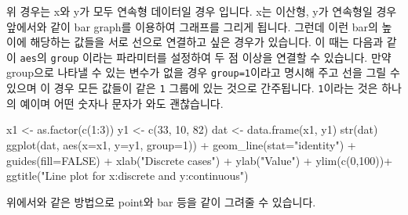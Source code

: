 \documentclass[
]{book}
\newenvironment{Shaded}{\begin{snugshade}}{\end{snugshade}}
\newcommand{\AttributeTok}[1]{\textcolor[rgb]{0.77,0.63,0.00}{#1}}
\newcommand{\ConstantTok}[1]{\textcolor[rgb]{0.00,0.00,0.00}{#1}}
\newcommand{\DecValTok}[1]{\textcolor[rgb]{0.00,0.00,0.81}{#1}}
\newcommand{\FunctionTok}[1]{\textcolor[rgb]{0.00,0.00,0.00}{#1}}
\newcommand{\NormalTok}[1]{#1}
\newcommand{\OtherTok}[1]{\textcolor[rgb]{0.56,0.35,0.01}{#1}}
\newcommand{\SpecialCharTok}[1]{\textcolor[rgb]{0.00,0.00,0.00}{#1}}
\newcommand{\StringTok}[1]{\textcolor[rgb]{0.31,0.60,0.02}{#1}}
\begin{document}
위 경우는 x와 y가 모두 연속형 데이터일 경우 입니다. x는 이산형, y가 연속형일 경우 앞에서와 같이 bar graph를 이용하여 그래프를 그리게 됩니다. 그런데 이런 bar의 높이에 해당하는 값들을 서로 선으로 연결하고 싶은 경우가 있습니다. 이 때는 다음과 같이 \texttt{aes}의 \texttt{group} 이라는 파라미터를 설정하여 두 점 이상을 연결할 수 있습니다. 만약 group으로 나타낼 수 있는 변수가 없을 경우 \texttt{group=1}이라고 명시해 주고 선을 그릴 수 있으며 이 경우 모든 값들이 같은 \texttt{1} 그룹에 있는 것으로 간주됩니다. \texttt{1}이라는 것은 하나의 예이며 어떤 숫자나 문자가 와도 괜찮습니다.

\begin{Shaded}
\begin{Highlighting}[]
\NormalTok{x1 }\OtherTok{\textless{}{-}} \FunctionTok{as.factor}\NormalTok{(}\FunctionTok{c}\NormalTok{(}\DecValTok{1}\SpecialCharTok{:}\DecValTok{3}\NormalTok{))}
\NormalTok{y1 }\OtherTok{\textless{}{-}} \FunctionTok{c}\NormalTok{(}\DecValTok{33}\NormalTok{, }\DecValTok{10}\NormalTok{, }\DecValTok{82}\NormalTok{)}
\NormalTok{dat }\OtherTok{\textless{}{-}} \FunctionTok{data.frame}\NormalTok{(x1, y1)}
\FunctionTok{str}\NormalTok{(dat)}
\FunctionTok{ggplot}\NormalTok{(dat, }\FunctionTok{aes}\NormalTok{(}\AttributeTok{x=}\NormalTok{x1, }\AttributeTok{y=}\NormalTok{y1, }\AttributeTok{group=}\DecValTok{1}\NormalTok{)) }\SpecialCharTok{+}
  \FunctionTok{geom\_line}\NormalTok{(}\AttributeTok{stat=}\StringTok{"identity"}\NormalTok{) }\SpecialCharTok{+}
  \FunctionTok{guides}\NormalTok{(}\AttributeTok{fill=}\ConstantTok{FALSE}\NormalTok{) }\SpecialCharTok{+}
  \FunctionTok{xlab}\NormalTok{(}\StringTok{"Discrete cases"}\NormalTok{) }\SpecialCharTok{+} \FunctionTok{ylab}\NormalTok{(}\StringTok{"Value"}\NormalTok{) }\SpecialCharTok{+}
  \FunctionTok{ylim}\NormalTok{(}\FunctionTok{c}\NormalTok{(}\DecValTok{0}\NormalTok{,}\DecValTok{100}\NormalTok{))}\SpecialCharTok{+}
  \FunctionTok{ggtitle}\NormalTok{(}\StringTok{"Line plot for x:discrete and y:continuous"}\NormalTok{)}
\end{Highlighting}
\end{Shaded}

위에서와 같은 방법으로 point와 bar 등을 같이 그려줄 수 있습니다.
\end{document}
